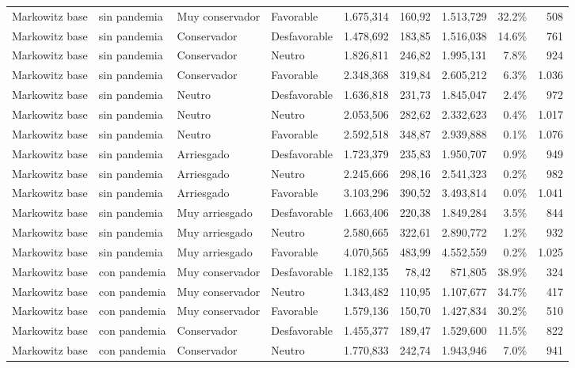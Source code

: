 \documentclass[11pt]{article}
\begin{document}
\begin{table}[H]
{\begin{tabular}{llllrrrrr}
Markowitz base & sin pandemia & Muy conservador & Favorable & 1.675,314 & 160,92 & 1.513,729 & 32.2\% & 508 \\
Markowitz base & sin pandemia & Conservador & Desfavorable & 1.478,692 & 183,85 & 1.516,038 & 14.6\% & 761 \\
Markowitz base & sin pandemia & Conservador & Neutro & 1.826,811 & 246,82 & 1.995,131 & 7.8\% & 924 \\
Markowitz base & sin pandemia & Conservador & Favorable & 2.348,368 & 319,84 & 2.605,212 & 6.3\% & 1.036 \\
Markowitz base & sin pandemia & Neutro & Desfavorable & 1.636,818 & 231,73 & 1.845,047 & 2.4\% & 972 \\
Markowitz base & sin pandemia & Neutro & Neutro & 2.053,506 & 282,62 & 2.332,623 & 0.4\% & 1.017 \\
Markowitz base & sin pandemia & Neutro & Favorable & 2.592,518 & 348,87 & 2.939,888 & 0.1\% & 1.076 \\
Markowitz base & sin pandemia & Arriesgado & Desfavorable & 1.723,379 & 235,83 & 1.950,707 & 0.9\% & 949 \\
Markowitz base & sin pandemia & Arriesgado & Neutro & 2.245,666 & 298,16 & 2.541,323 & 0.2\% & 982 \\
Markowitz base & sin pandemia & Arriesgado & Favorable & 3.103,296 & 390,52 & 3.493,814 & 0.0\% & 1.041 \\
Markowitz base & sin pandemia & Muy arriesgado & Desfavorable & 1.663,406 & 220,38 & 1.849,284 & 3.5\% & 844 \\
Markowitz base & sin pandemia & Muy arriesgado & Neutro & 2.580,665 & 322,61 & 2.890,772 & 1.2\% & 932 \\
Markowitz base & sin pandemia & Muy arriesgado & Favorable & 4.070,565 & 483,99 & 4.552,559 & 0.2\% & 1.025 \\
Markowitz base & con pandemia & Muy conservador & Desfavorable & 1.182,135 & 78,42 & 871,805 & 38.9\% & 324 \\
Markowitz base & con pandemia & Muy conservador & Neutro & 1.343,482 & 110,95 & 1.107,677 & 34.7\% & 417 \\
Markowitz base & con pandemia & Muy conservador & Favorable & 1.579,136 & 150,70 & 1.427,834 & 30.2\% & 510 \\
Markowitz base & con pandemia & Conservador & Desfavorable & 1.455,377 & 189,47 & 1.529,600 & 11.5\% & 822 \\
Markowitz base & con pandemia & Conservador & Neutro & 1.770,833 & 242,74 & 1.943,946 & 7.0\% & 941 \\

\end{tabular}}
\end{table}
\end{document}
